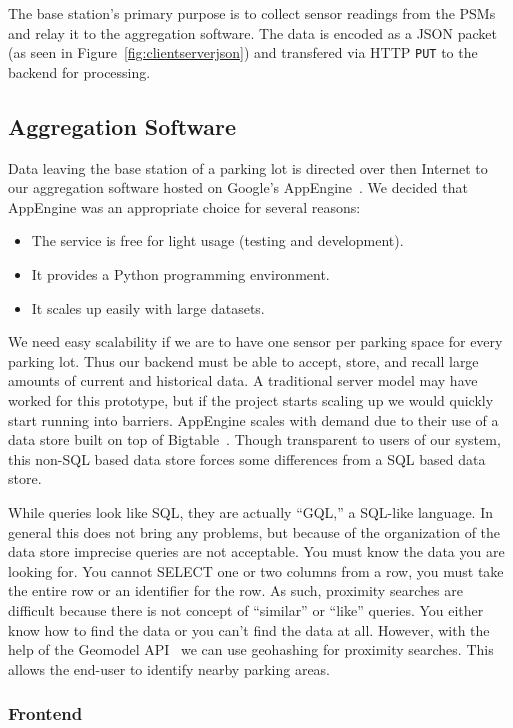\documentclass{acm_proc}
\begin{document}
The base station's primary purpose is to collect sensor readings from the
PSMs and relay it to the aggregation software.
The data is encoded as a JSON packet (as seen in
Figure~\ref{fig:clientserverjson}) and transfered via HTTP \texttt{PUT} to
the backend for processing.

\subsection{Aggregation Software}

Data leaving the base station of a parking lot is directed over then
Internet to our aggregation software hosted on Google's
AppEngine~\cite{google:appengine}.
We decided that AppEngine was an appropriate choice for several reasons:
\begin{itemize}
	\item The service is free for light usage (testing and development).
	\item It provides a Python programming environment.
	\item It scales up easily with large datasets.
\end{itemize}

We need easy scalability if we are to have one sensor per parking space for
every parking lot.
Thus our backend must be able to accept, store, and recall large amounts of
current and historical data.
A traditional server model may have worked for this prototype, but if the
project starts scaling up we would quickly start running into barriers.
AppEngine scales with demand due to their use of a data store built on top
of Bigtable~\cite{google:bigtable}.
Though transparent to users of our system, this non-SQL based data store
forces some differences from a SQL based data store.

While queries look like SQL, they are actually ``GQL,'' a SQL-like
language.
In general this does not bring any problems, but because of the
organization of the data store imprecise queries are not acceptable.
You must know the data you are looking for.
You cannot SELECT one or two columns from a row, you
must take the entire row or an identifier for the row.
As such, proximity searches are difficult because there is not concept of
``similar'' or ``like'' queries.
You either know how to find the data or you can't find the data at all.
However, with the help of the Geomodel API~\cite{geomodel} we can
use geohashing for proximity searches.
This allows the end-user to identify nearby parking areas.

\subsubsection{Frontend}
\end{document}
